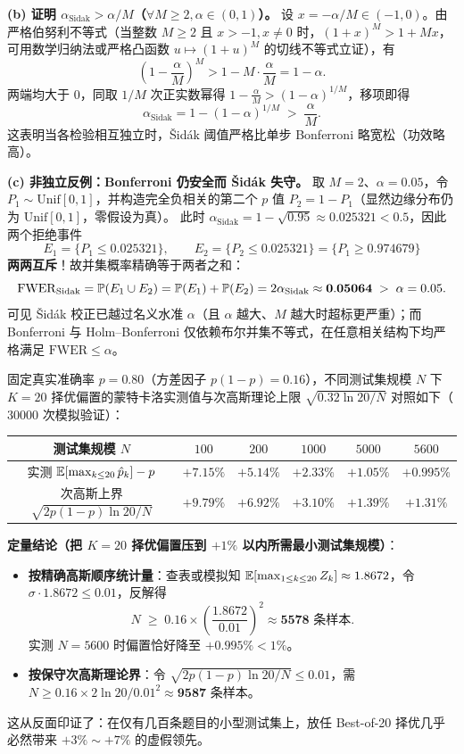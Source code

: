 \textbf{(b) 证明 $\alpha_{\text{Sidak}} > \alpha / M$（$\forall M \ge 2, \alpha \in (0,1)$）。}
设 $x = -\alpha/M \in (-1, 0)$。由严格伯努利不等式（当整数 $M \ge 2$ 且 $x > -1, x \neq 0$ 时，$(1+x)^M > 1 + Mx$，可用数学归纳法或严格凸函数 $u \mapsto (1+u)^M$ 的切线不等式立证），有
\[
  \left(1 - \frac{\alpha}{M}\right)^M > 1 - M \cdot \frac{\alpha}{M} = 1 - \alpha.
\]
两端均大于 $0$，同取 $1/M$ 次正实数幂得 $1 - \frac{\alpha}{M} > (1-\alpha)^{1/M}$，移项即得
\[
  \alpha_{\text{Sidak}} = 1 - (1-\alpha)^{1/M} \;>\; \frac{\alpha}{M}.
\]
这表明当各检验相互独立时，\v{S}id\'ak 阈值严格比单步 Bonferroni 略宽松（功效略高）。

\textbf{(c) 非独立反例：Bonferroni 仍安全而 \v{S}id\'ak 失守。}
取 $M = 2$、$\alpha = 0.05$，令 $P_1 \sim \mathrm{Unif}[0,1]$，并构造完全负相关的第二个 $p$ 值 $P_2 = 1 - P_1$（显然边缘分布仍为 $\mathrm{Unif}[0,1]$，零假设为真）。
此时 $\alpha_{\text{Sidak}} = 1 - \sqrt{0.95} \approx 0.025321 < 0.5$，因此两个拒绝事件
\[
  E_1 = \{P_1 \le 0.025321\}, \qquad
  E_2 = \{P_2 \le 0.025321\} = \{P_1 \ge 0.974679\}
\]
\textbf{两两互斥}！故并集概率精确等于两者之和：
\[
  \mathrm{FWER}_{\text{Sidak}} = \mathbb{P}(E_1 \cup E_2) = \mathbb{P}(E_1) + \mathbb{P}(E_2)
  = 2\alpha_{\text{Sidak}} \approx \mathbf{0.05064} \;>\; \alpha = 0.05.
\]
可见 \v{S}id\'ak 校正已越过名义水准 $\alpha$（且 $\alpha$ 越大、$M$ 越大时超标更严重）；而 Bonferroni 与 Holm--Bonferroni 仅依赖布尔并集不等式，在任意相关结构下均严格满足 $\mathrm{FWER} \le \alpha$。


固定真实准确率 $p = 0.80$（方差因子 $p(1-p) = 0.16$），不同测试集规模 $N$ 下 $K = 20$ 择优偏置的蒙特卡洛实测值与次高斯理论上限 $\sqrt{0.32\ln 20 / N}$ 对照如下（$30000$ 次模拟验证）：
\begin{center}
\footnotesize
\begin{tabular}{cccccc}
\toprule
测试集规模 $N$ & $100$ & $200$ & $1000$ & $5000$ & $5600$ \\
\midrule
实测 $\mathbb{E}[\max_{k\le 20}\hat{p}_k] - p$ & $+7.15\%$ & $+5.14\%$ & $+2.33\%$ & $+1.05\%$ & $+0.995\%$ \\
次高斯上界 $\sqrt{2p(1-p)\ln 20 / N}$ & $+9.79\%$ & $+6.92\%$ & $+3.10\%$ & $+1.39\%$ & $+1.31\%$ \\
\bottomrule
\end{tabular}
\end{center}
\textbf{定量结论（把 $K = 20$ 择优偏置压到 $+1\%$ 以内所需最小测试集规模）}：
\begin{itemize}
  \item \textbf{按精确高斯顺序统计量}：查表或模拟知 $\mathbb{E}[\max_{1\le k\le 20} Z_k] \approx 1.8672$，令 $\sigma \cdot 1.8672 \le 0.01$，反解得
  \[
    N \;\ge\; 0.16 \times \left(\frac{1.8672}{0.01}\right)^2 \approx \mathbf{5578} \text{ 条样本}.
  \]
  实测 $N = 5600$ 时偏置恰好降至 $+0.995\% < 1\%$。
  \item \textbf{按保守次高斯理论界}：令 $\sqrt{2p(1-p)\ln 20 / N} \le 0.01$，需 $N \ge 0.16 \times 2\ln 20 / 0.01^2 \approx \mathbf{9587}$ 条样本。
\end{itemize}
这从反面印证了：在仅有几百条题目的小型测试集上，放任 Best-of-20 择优几乎必然带来 $+3\% \sim +7\%$ 的虚假领先。

